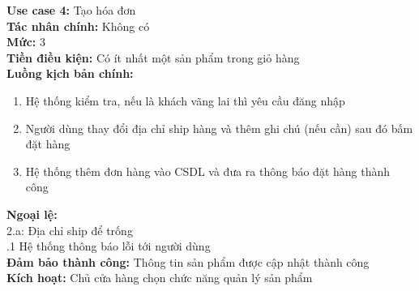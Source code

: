 \begin{boxed}
	\textbf{Use case 4:} Tạo hóa đơn                                         \\
	\textbf{Tác nhân chính:} Không có                                        \\
	\textbf{Mức:} 3                                                          \\
	\textbf{Tiền điều kiện:} Có ít nhất một sản phẩm trong giỏ hàng          \\
	\textbf{Luồng kịch bản chính:}                                           \\
	\begin{enumerate}
		\vspace{-2em}
		\itemsep-0.5em
		\item Hệ thống kiểm tra, nếu là khách vãng lai thì yêu cầu đăng nhập
		\item Người dùng thay đổi địa chỉ ship hàng và thêm ghi chú (nếu cần) sau đó bấm đặt hàng
		\item Hệ thống thêm đơn hàng vào CSDL và đưa ra thông báo đặt hàng thành công
		      \vspace{-1em}
	\end{enumerate}
	\textbf{Ngoại lệ:}                                                       \\
	\hspace{1em}2.a: Địa chỉ ship để trống                                   \\
	\hspace{2.5em}.1 Hệ thống thông báo lỗi tới người dùng                   \\
	\textbf{Đảm bảo thành công:} Thông tin sản phẩm được cập nhật thành công \\
	\textbf{Kích hoạt:} Chủ cửa hàng chọn chức năng quản lý sản phẩm
\end{boxed}

